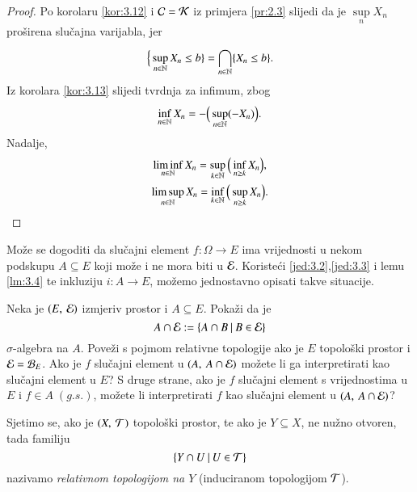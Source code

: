 \begin{proof}
    Po korolaru \ref{kor:3.12} i $\mathcal{C} = \mathcal{K}$ iz primjera \ref{pr:2.3} slijedi da je $\sup\limits_n X_n$ pro\v sirena slu\v cajna varijabla, jer
    \begin{equation*}
        \Big\{ \sup\limits_{n \in \mathbb{N}} X_n \leq b \} = \bigcap\limits_{n \in \mathbb{N}}^{} \{ X_n \leq b \}.
    \end{equation*}
    Iz korolara \ref{kor:3.13} slijedi tvrdnja za infimum, zbog
    \begin{equation*}
        \inf\limits_{n \in \mathbb{N}} X_n = - \Big(\sup\limits_{n \in \mathbb{N}} (- X_n) \Big).
    \end{equation*}
    Nadalje,
    \begin{equation*}
        \begin{gathered}
            \liminf\limits_{n \in \mathbb{N}} X_n = \sup\limits_{k \in \mathbb{N}} \Big(\inf\limits_{n \geq k} X_n \Big),\\
            \limsup\limits_{n \in \mathbb{N}} X_n = \inf\limits_{k \in \mathbb{N}} \Big( \sup\limits_{n\geq k} X_n \Big).
        \end{gathered}
    \end{equation*}
\end{proof}

Mo\v ze se dogoditi da slu\v cajni element $f:\Omega \to E$ ima vrijednosti u nekom podskupu $A \subseteq E$ koji mo\v ze i ne mora biti u $\mathcal{E}$. Koriste\' ci \eqref{jed:3.2},\eqref{jed:3.3} i lemu \ref{lm:3.4} te inkluziju $i: A \to E$, mo\v zemo jednostavno opisati takve situacije.

\begin{zad} \label{zad:3.15}
    Neka je $(E, \: \mathcal{E})$ izmjeriv prostor i $A \subseteq E$.
    Poka\v zi da je
    \begin{equation*}
        A \cap \mathcal{E} := \{{A \cap B} \: | \: {B \in \mathcal{E}}\}
    \end{equation*}
    $\sigma$-algebra na $A$.
    Pove\v zi s pojmom relativne topologije ako je $E$ topolo\v ski prostor i $\mathcal{E} = \mathcal{B}_{E}$.
    Ako je $f$ slu\v cajni element u $(A, \: A \cap \mathcal{E})$ mo\v zete li ga interpretirati kao slu\v cajni element u $E$?
    S druge strane, ako je $f$ slu\v cajni element s vrijednostima u $E$ i $f \in A \; (g.s.)$, mo\v zete li interpretirati $f$ kao slu\v cajni element u $({A}, \: {A \cap \mathcal{E}})$?
\end{zad}

\begin{nap} \label{nap:3.15-1}
    Sjetimo se, ako je $({X}, \: {\mathcal{T}})$ topolo\v ski prostor, te ako je $Y \subseteq X$, ne nu\v zno otvoren, tada familiju
    \begin{equation*}
        \{{Y \cap U} \: | \: {U \in \mathcal{T}}\}
    \end{equation*}
    nazivamo \emph{relativnom topologijom na $Y$} (induciranom topologijom $\mathcal{T}$).
\end{nap}

